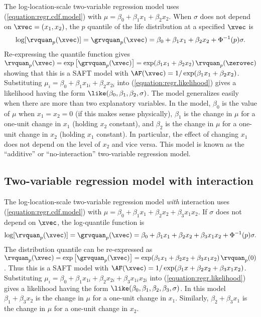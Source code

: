 The log-location-scale two-variable regression model uses
(\ref{equation:regr.cdf.model}) with $\mu=\beta_{0}+\beta_{1} x_{1} +
\beta_{2} x_{2}$. When $\sigma$ does not depend on
$\xvec=(x_{1},x_{2})$,
the $p$ quantile of the life distribution at a specified $\xvec$ is 
\begin{equation}
\label{equation:two.var.regr.model}
\log[\rvquan_{p}(\xvec)] =\grvquan_{p}(\xvec)=\beta_{0}+
	\beta_{1} x_{1} + \beta_{2} x_{2} + \Phi^{-1}(p) \sigma.
\end{equation}
Re-expressing the quantile function gives
$\rvquan_{p}(\xvec)=\exp \left [\grvquan_{p}(\xvec) \right ]=
\exp(\beta_{1} x_{1} + \beta_{2} x_{2}) \, \rvquan_{p}(\zerovec)$
showing that this is a SAFT model with $\AF(\xvec)=1/\exp(\beta_{1} x_{1} +
\beta_{2} x_{2})$.  Substituting $\mu_{i} = \beta_{0} + \beta_{1}
x_{1i} +
\beta_{2} x_{2i}$ into (\ref{equation:regr.likelihood}) gives a
likelihood having the form $\like(\beta_{0},\beta_{1},
\beta_{2},\sigma)$.  The model
generalizes easily when there are more than two explanatory variables.
In the model, $\beta_{0}$ is the value of $\mu$ when $x_{1}=x_{2}=0$
(if this makes sense physically), $\beta_{1}$ is the change in $\mu$
for a one-unit change in $x_{1}$ (holding $x_{2}$ constant), 
and $\beta_{2}$ is the change in $\mu$
for a one-unit change in $x_{2}$ (holding $x_{1}$ constant).
In particular, the effect of changing $x_{1}$ does not depend on the
level of $x_{2}$ and vice versa.
This model is known as the ``additive''
or ``no-interaction'' two-variable regression model. 

\subsection{Two-variable regression model with interaction}
\label{section:two.var.with.int}
The log-location-scale two-variable regression model {\em
with} interaction uses (\ref{equation:regr.cdf.model}) with
$\mu=\beta_{0}+\beta_{1} x_{1} +
\beta_{2} x_{2}+
\beta_{3} x_{1}x_{2}$. If $\sigma$ does not
depend on $\xvec$, the log-quantile function is
\begin{displaymath}
\log[\rvquan_{p}(\xvec)] =\grvquan_{p}(\xvec)=\beta_{0}+
	\beta_{1} x_{1} + \beta_{2} x_{2}+ \beta_{3}x_{1}x_{2} 
+ \Phi^{-1}(p) \sigma.
\end{displaymath}
The distribution quantile can be re-expressed as
$\rvquan_{p}(\xvec)=\exp \left [\grvquan_{p}(\xvec) \right ]= 
		\exp(\beta_{1} x_{1} + \beta_{2} x_{2}+
                \beta_{3}x_{1}x_{2}) \, \rvquan_{p}(0)$.
Thus this is a SAFT model with  $\AF(\xvec)=1/\exp(\beta_{1}
x+\beta_{2}x_{2}+
\beta_{3} x_{1}x_{2})$.
Substituting $\mu_{i}  = \beta_{0} + \beta_{1} x_{1i} +
\beta_{2} x_{2i}+
\beta_{3} x_{1i}x_{2i}$ into (\ref{equation:regr.likelihood}) gives a
likelihood having the form $\like(\beta_{0},\beta_{1},
\beta_{2},\beta_{3},\sigma)$. 
In this model $\beta_{1} + \beta_{3}x_{2}$ is the change in $\mu$ for
a one-unit change in $x_{1}$. Similarly, $\beta_{2} + \beta_{3}x_{1}$
is the change in $\mu$ for a one-unit change in $x_{2}$.

